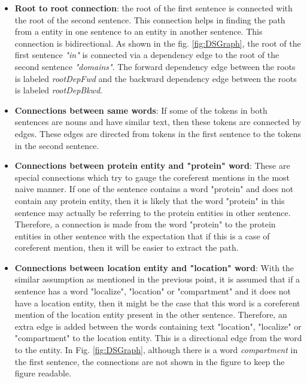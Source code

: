 \begin{itemize}

\item \textbf{Root to root connection}: the root of the first sentence is connected with the root of the second sentence. This connection helps in finding the path from a entity in one sentence to an entity in another sentence. This connection is bidirectional. As shown in the fig. \ref{fig:DSGraph}, the root of the first sentence \textit{"in"} is connected via a dependency edge to the root of the second sentence \textit{"domains"}. The forward dependency edge between the roots is labeled \textit{rootDepFwd} and the backward dependency edge between the roots is labeled \textit{rootDepBkwd}.

\item \textbf{Connections between same words}: If some of the tokens in both sentences are nouns and have similar text, then these tokens are connected by edges. These edges are directed from tokens in the first sentence to the tokens in the second sentence.

\item \textbf{Connections between protein entity and "protein" word}: These are special connections which try to gauge the coreferent mentions in the most naive manner. If one of the sentence contains a word "protein" and does not contain any protein entity, then it is likely that the word "protein" in this sentence may actually be referring to the protein entities in other sentence. Therefore, a connection is made from the word "protein" to the protein entities in other sentence with the expectation that if this is a case of coreferent mention, then it will be easier to extract the path. 

\item \textbf{Connections between location entity and "location" word}: With the similar assumption as mentioned in the previous point, it is assumed that if a sentence has a word "localize", "location" or "compartment" and it does not have a location entity, then it might be the case that this word is a coreferent mention of the location entity present in the other sentence. Therefore, an extra edge is added between the words containing text "location", "localize" or "compartment" to the location entity. This is a directional edge from the word to the entity. In Fig. \ref{fig:DSGraph}, although there is a word \textit{compartment} in the first sentence, the connections are not shown in the figure to keep the figure readable.

\end{itemize}

